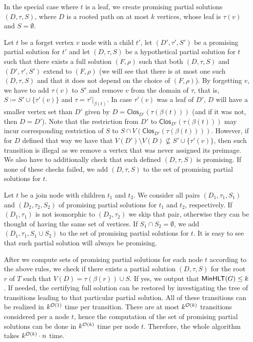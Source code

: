 \documentclass[a4paper,11pt]{article}
\begin{document}
\begin{description}[leftmargin=0pt]
    In the special case where $t$ is a leaf, we create promising partial solutions $(D, \tau, S)$, where $D$ is a rooted path on at most $k$ vertices, whose leaf is $\tau(v)$ and $S = \emptyset$.
    
    \item[Forget vertex.] Let $t$ be a forget vertex $v$ node with a child $t'$, let $(D', \tau', S')$ be a promising partial solution for $t'$ and let $(D, \tau, S)$ be a hypothetical partial solution for $t$ such that there exists a full solution $(F, \rho)$ such that both $(D, \tau, S)$ and $(D', \tau', S')$ extend to $(F, \rho)$
    (we will see that there is at most one such $(D, \tau, S)$ and that it does not depend on the choice of $(F, \rho)$). By forgetting $v$, we have to add $\tau(v)$ to $S'$ and remove $v$ from the domain of $\tau$, that is, $S \coloneqq S' \cup \{\tau'(v)\}$ and $\tau = \tau'|_{\beta(t)}$. In case $\tau'(v)$ was a leaf of $D'$, $D$ will have a smaller vertex set than $D'$ given by $D = \mathsf{Clos}_{D'}(\tau(\beta(t)))$ (and if it was not, then $D = D'$). Note that the restriction from $D'$ to $\mathsf{Clos}_{D'}(\tau(\beta(t)))$ may incur corresponding restriction of $S$ to $S \cap V(\mathsf{Clos}_{D'}(\tau(\beta(t))))$. However, if for $D$ defined that way we have that $V(D') \setminus V(D) \not\subseteq S' \cup \{\tau'(v)\}$, then such transition is illegal as we remove a vertex that was never assigned its preimage. We also have to additionally check that such defined $(D, \tau, S)$ is promising. If none of these checks failed, we add $(D, \tau, S)$ to the set of promising partial solutions for $t$.
    
    \item[Join.]
        Let $t$ be a join node with children $t_1$ and $t_2$. We consider all pairs $(D_1, \tau_1, S_1)$ and $(D_2, \tau_2, S_2)$ of promising partial solutions for $t_1$ and $t_2$, respectively. If $(D_1, \tau_1)$ is not isomorphic to $(D_2, \tau_2)$ we skip that pair, otherwise they can be thought of having the same set of vertices. If $S_1 \cap S_2 = \emptyset$, we add $(D_1, \tau_1, S_1 \cup S_2)$ to the set of promising partial solutions for $t$. It is easy to see that such partial solution will always be promising.
\end{description}


After we compute sets of promising partial solutions for each node $t$ according to the above rules, we check if there exists a partial solution $(D, \tau, S)$ for the root $r$ of $T$ such that $V(D) = \tau(\beta(r)) \cup S$. If yes, we output that $\mathsf{MinHLT}(G) \le k$. If needed, the certifying full solution can be restored by investigating the tree of transitions leading to that particular partial solution.
%
All of these transitions can be realized in $k^{{\mathcal{O}}(1)}$ time per transition. There are at most $k^{{\mathcal{O}}(k)}$ transitions considered per a node $t$, 
hence the computation of the set of promising partial solutions can be done in $k^{{\mathcal{O}}(k)}$ time per node $t$. Therefore, the whole algorithm takes $k^{{\mathcal{O}}(k)} \cdot n$ time.
\end{document}
